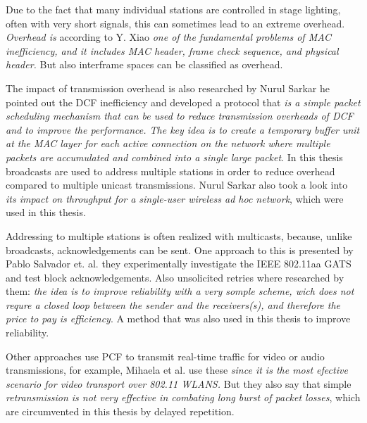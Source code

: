 Due to the fact that many individual stations are controlled in stage lighting, 
often with very short signals, this can sometimes lead to an extreme overhead.
\emph{Overhead is} 
according to Y. Xiao \cite{PerformanceEnhancement}
\emph{one of the fundamental problems of MAC inefficiency, and it includes MAC header, frame check sequence, and physical header.}
But also interframe spaces can be classified as overhead.

The impact of transmission overhead is also researched by Nurul Sarkar \cite{TheImpactOfOverheads}
he pointed out the DCF inefficiency and developed a protocol that
\emph{is a simple packet scheduling mechanism that can be used to reduce transmission overheads of DCF and to improve the performance. 
The key idea is to create a temporary buffer unit at the MAC layer for each active connection on the network 
where multiple packets are accumulated and combined into a single large packet}.
In this thesis broadcasts are used to address multiple stations 
in order to reduce overhead compared to multiple unicast transmissions.
Nurul Sarkar \cite{TheImpactOfOverheads} also took a look into 
\emph{its impact on throughput for a single-user wireless ad hoc network},
which were used in this thesis.

Addressing to multiple stations is often realized with multicasts, 
because, unlike broadcasts, acknowledgements can be sent. One approach to this is presented by Pablo Salvador et. al. 
\cite{AFirstImplementation}
they experimentally investigate the IEEE 802.11aa GATS and test block acknowledgements.
Also unsolicited retries where researched by them: 
\emph{the idea is to improve reliability with a very somple scheme, wich does not requre a 
closed loop between the sender and the receivers(s), and therefore the price to pay is efficiency}.
A method that was also used in this thesis to improve reliability.

Other approaches use PCF to transmit real-time traffic for video or audio transmissions,
for example, Mihaela et al. \cite{AdaptiveCrossLayer} use these 
\emph{since it is the most efective scenario for video transport over 802.11 WLANS.}
But they also say that simple 
\emph{retransmission is not very effective in combating long burst of packet losses},
which are circumvented in this thesis by delayed repetition.



